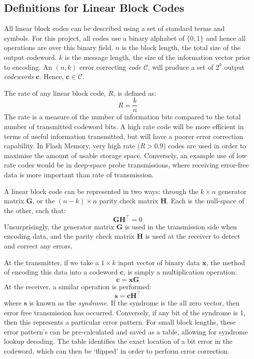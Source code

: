 \documentclass[11pt]{article}
\numberwithin{equation}{subsection}
\begin{document}
\subsection{Definitions for Linear Block Codes} \label{3.1:definitions}
All linear block codes can be described using a set of standard terms and symbols. For this project, all codes use a binary alphabet of $\{0,1\}$ and hence all operations are over this binary field. $n$ is the block length, the total size of the output codeword. $k$ is the message length, the size of the information vector prior to encoding. An $(n,k)$ error correcting \textit{code} $\mathcal{C}$, will produce a set of $2^k$ output \textit{codewords} $\mathbf{c}$. Hence, $\mathbf{c} \in \mathcal{C}$. 

The rate of any linear block code, $R$, is defined as: 
\begin{equation}
R = \dfrac{k}{n}
\end{equation}
The rate is a measure of the number of information bits compared to the total number of transmitted codeword bits. A high rate code will be more efficient in terms of useful information transmitted, but will have a poorer error correction capability. In Flash Memory, very high rate ($R > 0.9$) codes are used in order to maximise the amount of usable storage space. Conversely, an example use of low rate codes would be in deep-space probe transmissions, where receiving error-free data is more important than rate of transmission.

A linear block code can be represented in two ways: through the $k \times n$ generator matrix $\mathbf{G}$, or the $(n - k) \times n$ parity check matrix $\mathbf{H}$. Each is the null-space of the other, such that:
\begin{equation}
\mathbf{G H}^\top = 0
\end{equation}
Unsurprisingly, the generator matrix $\mathbf{G}$ is used in the transmission side when encoding data, and the parity check matrix $\mathbf{H}$ is used at the receiver to detect and correct any errors.

At the transmitter, if we take a $1 \times k$ input vector of binary data $\mathbf{x}$, the method of encoding this data into a codeword $\mathbf{c}$, is simply a multiplication operation:
\begin{equation}
\mathbf{c = xG}
\end{equation}
At the receiver, a similar operation is performed:
\begin{equation}
\mathbf{s = c H}^\top
\end{equation}
where $\mathbf{s}$ is known as the \textit{syndrome}. If the syndrome is the all zero vector, then error free transmission has occurred. Conversely, if any bit of the syndrome is 1, then this represents a particular error pattern. For small block lengths, these error pattern's can be pre-calculated and saved as a table, allowing for syndrome lookup decoding. The table identifies the exact location of a bit error in the codeword, which can then be `flipped' in order to perform error correction.
\end{document}

